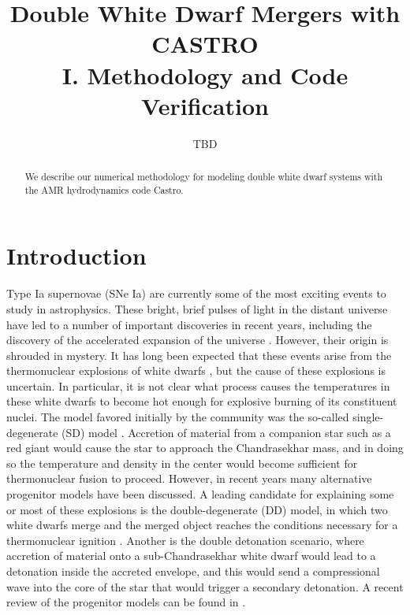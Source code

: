 \documentclass[12pt,preprint]{aastex}
\begin{document}
\title{Double White Dwarf Mergers with CASTRO\\ I. Methodology and Code 
       Verification}


\author{TBD}
\begin{abstract}
We describe our numerical methodology for modeling double white dwarf
systems with the AMR hydrodynamics code Castro.

\end{abstract}

\section{Introduction}

Type Ia supernovae (SNe Ia) are currently some of the most exciting events to study in astrophysics. These bright, brief pulses of light in the distant universe have led to a number of important discoveries in recent years, including the discovery of the accelerated expansion of the universe \citep{perlmutter1999,riess1998}. However, their origin is shrouded in mystery. It has long been expected that these events arise from the thermonuclear explosions of white dwarfs \citep{hoyle_fowler:1960}, but the cause of these explosions is uncertain. In particular, it is not clear what process causes the temperatures in these white dwarfs to become hot enough for explosive burning of its constituent nuclei. The model favored initially by the community was the so-called single-degenerate (SD) model \citep{whelan_iben:1973}. Accretion of material from a companion star such as a red giant would cause the star to approach the Chandrasekhar mass, and in doing so the temperature and density in the center would become sufficient for thermonuclear fusion to proceed. However, in recent years many alternative progenitor models have been discussed. A leading candidate for explaining some or most of these explosions is the double-degenerate (DD) model, in which two white dwarfs merge and the merged object reaches the conditions necessary for a thermonuclear ignition \citep{ibentutukov:1984,webbink:1984}. Another is the double detonation scenario, where accretion of material onto a sub-Chandrasekhar white dwarf would lead to a detonation inside the accreted envelope, and this would send a compressional wave into the core of the star that would trigger a secondary detonation. A recent review of the progenitor models can be found in \citet{hillebrandt:2013}.
\end{document}

